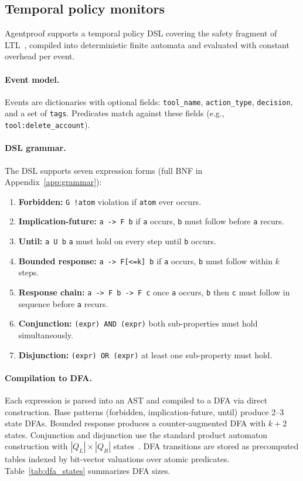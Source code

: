 \subsection{Temporal policy monitors}
Agentproof supports a temporal policy DSL covering the safety fragment of
LTL~\citep{pnueli1977temporal}, compiled into deterministic finite
automata and evaluated with constant overhead per event.

\paragraph{Event model.}
Events are dictionaries with optional fields: \texttt{tool\_name},
\texttt{action\_type}, \texttt{decision}, and a set of \texttt{tags}.
Predicates match against these fields (e.g., \texttt{tool:delete\_account}).

\paragraph{DSL grammar.}
The DSL supports seven expression forms (full BNF in
Appendix~\ref{app:grammar}):
\begin{enumerate}
  \item \textbf{Forbidden:} \texttt{G !atom}   violation if
    \texttt{atom} ever occurs.
  \item \textbf{Implication-future:} \texttt{a -> F b}   if \texttt{a}
    occurs, \texttt{b} must follow before \texttt{a} recurs.
  \item \textbf{Until:} \texttt{a U b}   \texttt{a} must hold on every
    step until \texttt{b} occurs.
  \item \textbf{Bounded response:} \texttt{a -> F[<=k] b}   if
    \texttt{a} occurs, \texttt{b} must follow within $k$ steps.
  \item \textbf{Response chain:} \texttt{a -> F b -> F c}   once
    \texttt{a} occurs, \texttt{b} then \texttt{c} must follow in
    sequence before \texttt{a} recurs.
  \item \textbf{Conjunction:} \texttt{(expr) AND (expr)}   both
    sub-properties must hold simultaneously.
  \item \textbf{Disjunction:} \texttt{(expr) OR (expr)}   at least
    one sub-property must hold.
\end{enumerate}

\paragraph{Compilation to DFA.}
Each expression is parsed into an AST and compiled to a DFA via
direct construction. Base patterns (forbidden, implication-future,
until) produce 2--3 state DFAs. Bounded response produces a
counter-augmented DFA with $k+2$ states. Conjunction and disjunction
use the standard product automaton construction with
$|Q_L| \times |Q_R|$ states~\citep{vardi1994automata}. DFA transitions
are stored as precomputed tables indexed by bit-vector valuations over
atomic predicates. Table~\ref{tab:dfa_states} summarizes DFA sizes.

